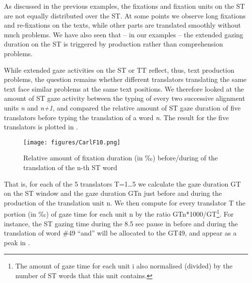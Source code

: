 \documentclass[output=paper]{LSP/langsci}
\begin{document}
As discussed in the previous examples, the fixations and fixation units on the ST are not equally distributed over the ST. At some points we observe long fixations and re-fixations on the texts, while other parts are translated smoothly without much problems. We have also seen that -- in our examples -- the extended gazing duration on the ST is triggered by production rather than comprehension problems. 

While extended gaze activities on the ST or TT reflect, thus, text production problems, the question remains whether different translators translating the same text face similar problems at the same text positions. We therefore looked at the amount of ST gaze activity between the typing of every two successive alignment units \textit{n} and \textit{n}\textit{+1}, and compared the relative amount of ST gaze duration of five translators before typing the translation of a word \textit{n}. The result for the five translators is plotted in .

\begin{figure}
\texttt{[image: figures/CarlF10.png]}
\caption{Relative amount of fixation duration (in ‰) before/during of the translation of the n-th ST word}
\label{fig:carl:10}
\end{figure} 

That is, for each of the 5 translators T=1\ldots 5 we calculate the gaze duration GT on the ST window and the gaze duration GTn just before and during the production of the translation unit n. We then compute for every translator T the portion (in ‰) of gaze time for each unit n by the ratio GTn*1000/GT\footnote{The amount of gaze time for each unit i also normalised (divided) by the number of ST words that this unit contains.}.  For instance, the ST gazing time during the 8.5 sec pause in  before and during the translation of word \#49 ``and'' will be allocated to the GT49, and appear as a peak in .
\end{document}
